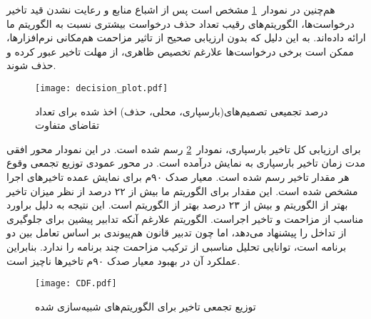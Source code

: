 هم‌چنین در نمودار~\ref{figure:decision_plot} مشخص است پس از اشباع منابع و رعایت نشدن قید تاخیر درخواست‌ها، الگوریتم‌های رقیب تعداد حذف درخواست بیشتری نسبت به الگوریتم ما ارائه داده‌اند. به این دلیل که بدون ارزیابی صحیح از تاثیر مزاحمت هم‌مکانی نرم‌افزارها، ممکن است برخی درخواست‌ها علارغم تخصیص ظاهری، از مهلت تاخیر عبور کرده و حذف شوند.

\vspace{0.5cm}
\begin{figure}[h]
\centering
\texttt{[image: decision\_plot.pdf]}
\caption{درصد تجمیعی تصمیم‌های(بارسپاری، محلی، حذف) اخذ شده برای تعداد تقاضای متفاوت}
\label{figure:decision_plot}
\end{figure}
\vspace{0.5cm}

برای ارزیابی کل تاخیر بارسپاری، نمودار~\ref{figure:CDF_plot} رسم شده است. در این نمودار محور افقی مدت زمان تاخیر بارسپاری به نمایش درآمده است. در محور عمودی توزیع تجمعی وقوع هر مقدار تاخیر رسم شده است. معیار صدک ۹۰م برای نمایش عمده تاخیرهای اجرا مشخص شده است. این مقدار برای الگوریتم ما بیش از ۲۲ درصد از نظر میزان تاخیر بهتر از الگوریتم  و بیش از ۲۳ درصد بهتر از الگوریتم  است. این نتیجه به دلیل براورد مناسب از مزاحمت و تاخیر اجراست. الگوریتم  علارغم آنکه تدابیر پیشین برای جلوگیری از تداخل را پیشنهاد می‌دهد، اما چون تدبیر قانون هم‌پیوندی بر اساس تعامل بین دو برنامه‌ است، توانایی تحلیل مناسبی از ترکیب مزاحمت چند برنامه را ندارد. بنابراین عملکرد آن در بهبود معیار صدک ۹۰م تاخیرها ناچیز است.

\vspace{0.5cm}
\begin{figure}[h]
\centering
\texttt{[image: CDF.pdf]}
\caption{توزیع تجمعی تاخیر برای الگوریتم‌های شبیه‌سازی شده}
\label{figure:CDF_plot}
\end{figure}
\vspace{0.5cm}

